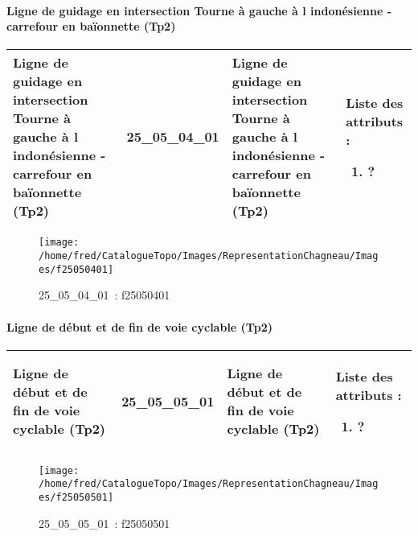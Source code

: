 \documentclass[12pt,titlepage]{book}
\begin{document}
\paragraph{Ligne de guidage en intersection Tourne à gauche à l indonésienne - carrefour en baïonnette (Tp2)}
\noindent
\vspace{\baselineskip}

\renewcommand{\arraystretch}{1.2}
\begin{supertabular}{|p{10cm}|c|p{13cm}|p{12cm}|}
 Ligne de guidage en intersection Tourne à gauche à l indonésienne - carrefour en baïonnette (Tp2) & 25\_05\_04\_01 & Ligne de guidage en intersection Tourne à gauche à l indonésienne - carrefour en baïonnette (Tp2) & Liste des attributs :
\begin{enumerate}
  \item ?\end{enumerate}
\\
\hline
\end{supertabular}
\begin{figure}[h!]
  \hfill         %
  \begin{minipage}[t]{3cm}
    \begin{center}
      \texttt{[image: /home/fred/CatalogueTopo/Images/RepresentationChagneau/Images/f25050401]}
      \caption[~25\_05\_04\_01]{\small{25\_05\_04\_01~:} \tiny{f25050401}}\label{f25050401}
    \end{center}
  \end{minipage}
\end{figure}


\paragraph{Ligne de début et de fin de voie cyclable (Tp2)}
\noindent
\vspace{\baselineskip}

\renewcommand{\arraystretch}{1.2}
\begin{supertabular}{|p{10cm}|c|p{13cm}|p{12cm}|}
 Ligne de début et de fin de voie cyclable (Tp2) & 25\_05\_05\_01 & Ligne de début et de fin de voie cyclable (Tp2) & Liste des attributs :
\begin{enumerate}
  \item ?\end{enumerate}
\\
\hline
\end{supertabular}
\begin{figure}[h!]
  \hfill         %
  \begin{minipage}[t]{3cm}
    \begin{center}
      \texttt{[image: /home/fred/CatalogueTopo/Images/RepresentationChagneau/Images/f25050501]}
      \caption[~25\_05\_05\_01]{\small{25\_05\_05\_01~:} \tiny{f25050501}}\label{f25050501}
    \end{center}
  \end{minipage}
\end{figure}
\end{document}
